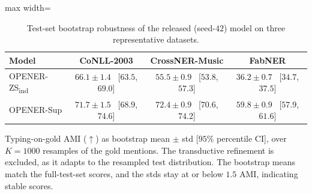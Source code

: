 \documentclass[pdflatex,sn-basic,Numbered]{sn-jnl}
\newcommand{\zsind}{OPENER-ZS\textsubscript{ind}}
\begin{document}
\begin{table}[!t]
\centering
\caption{Test-set bootstrap robustness of the released (seed-$42$) model on three representative datasets.}
\label{tab:bootstrap}
\small
\begin{adjustbox}{max width=\textwidth}
\begin{threeparttable}
\begin{tabular}{lccc}
\toprule
Model & CoNLL-2003 & CrossNER-Music & FabNER \\
\midrule
\zsind{}   & $66.1 \pm 1.4$ ~[$63.5$, $69.0$] & $55.5 \pm 0.9$ ~[$53.8$, $57.3$] & $36.2 \pm 0.7$ ~[$34.7$, $37.5$] \\
OPENER-Sup & $71.7 \pm 1.5$ ~[$68.9$, $74.6$] & $72.4 \pm 0.9$ ~[$70.6$, $74.2$] & $59.8 \pm 0.9$ ~[$57.9$, $61.6$] \\
\bottomrule
\end{tabular}
\begin{tablenotes}[flushleft]
\footnotesize
\item Typing-on-gold AMI ($\uparrow$) as bootstrap mean $\pm$ std [$95\%$ percentile CI], over $K{=}1000$ resamples of the gold mentions. The transductive refinement is excluded, as it adapts to the resampled test distribution. The bootstrap means match the full-test-set scores, and the stds stay at or below $1.5$ AMI, indicating stable scores.
\end{tablenotes}
\end{threeparttable}
\end{adjustbox}
\end{table}
\end{document}
